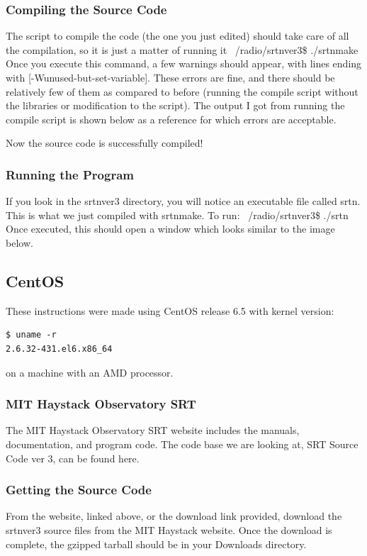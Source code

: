 \documentclass[11pt]{article} %
\begin{document}
\subsubsection{Compiling the Source Code}
The script to compile the code (the one you just edited) should take care of all the compilation, so it is just a matter of running it
~/radio/srtnver3\$ ./srtnmake
Once you execute this command, a few warnings should appear, with lines ending with [-Wunused-but-set-variable]. These errors are fine, and there should be relatively few of them as compared to before (running the compile script without the libraries or modification to the script). The output I got from running the compile script is shown below as a reference for which errors are acceptable.

Now the source code is successfully compiled!

\subsubsection{Running the Program}
If you look in the srtnver3 directory, you will notice an executable file called srtn. This is what we just compiled with srtnmake. To run:
~/radio/srtnver3\$ ./srtn
Once executed, this should open a window which looks similar to the image below.


\subsection{CentOS}


These instructions were made using CentOS release 6.5 with kernel version:

\begin{verbatim}
$ uname -r
2.6.32-431.el6.x86_64
\end{verbatim}
on a machine with an AMD processor.

\subsubsection{MIT Haystack Observatory SRT}
The MIT Haystack Observatory SRT website includes the manuals, documentation, and program code. The code base we are looking at, SRT Source Code ver 3, can be found here.

\subsubsection{Getting the Source Code}
From the website, linked above, or the download link provided, download the srtnver3 source files from the MIT Haystack website. Once the download is complete, the gzipped tarball should be in your Downloads directory.
\end{document}
